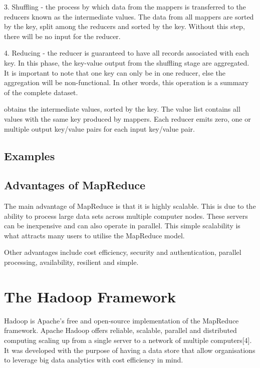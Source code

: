 \documentclass[11pt]{book}
\begin{document}
3. Shuffling - the process by which data from the mappers is transferred to the reducers known as the intermediate values. The data from all mappers are sorted by the key, split among the reducers and sorted by the key. Without this step, there will be no input for the reducer.

4. Reducing - the reducer is guaranteed to have all records associated with each key. In this phase, the key-value output from the shuffling stage are aggregated.  It is important to note that one key can only be in one reducer, else the aggregation will be non-functional. In other words, this operation is a summary of the complete dataset. 

obtains the intermediate values, sorted by the key. The value list contains all values with the same key produced by mappers. Each reducer emits zero, one or multiple output key/value pairs for each input key/value pair.


\section{Examples}



\section{Advantages of MapReduce}

The main advantage of MapReduce is that it is highly scalable. This is due to the ability to process large data sets across multiple computer nodes. These servers can be inexpensive and can also operate in parallel. This simple scalability is what attracts many users to utilise the MapReduce model.

Other advantages include cost efficiency, security and authentication, parallel processing, availability, resilient and simple.


\chapter{The Hadoop Framework}

Hadoop is Apache's free and open-source implementation of the MapReduce framework. Apache Hadoop offers reliable, scalable, parallel and distributed computing scaling up from a single server to a network of multiple computers[4]. It was developed with the purpose of having a data store that allow organisations to leverage big data analytics with cost efficiency in mind.\\
\end{document}
